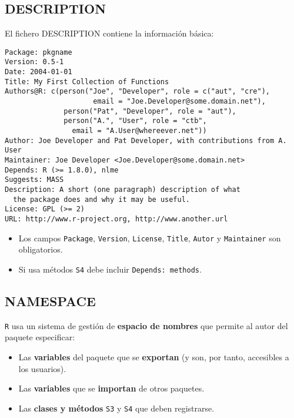 \subsection{DESCRIPTION}
\label{sec:org1a6507c}
\label{subsec:description}
El fichero DESCRIPTION contiene la información básica:
\begin{examplebox}
\begin{verbatim}
Package: pkgname
Version: 0.5-1
Date: 2004-01-01
Title: My First Collection of Functions
Authors@R: c(person("Joe", "Developer", role = c("aut", "cre"),
                     email = "Joe.Developer@some.domain.net"),
              person("Pat", "Developer", role = "aut"),
              person("A.", "User", role = "ctb",
     	        email = "A.User@whereever.net"))
Author: Joe Developer and Pat Developer, with contributions from A. User
Maintainer: Joe Developer <Joe.Developer@some.domain.net>
Depends: R (>= 1.8.0), nlme
Suggests: MASS
Description: A short (one paragraph) description of what
  the package does and why it may be useful.
License: GPL (>= 2)
URL: http://www.r-project.org, http://www.another.url
\end{verbatim}
\end{examplebox}
\begin{itemize}
\item Los campos \texttt{Package}, \texttt{Version}, \texttt{License}, \texttt{Title}, \texttt{Autor} y \texttt{Maintainer} son obligatorios.
\item Si usa métodos \texttt{S4} debe incluir \texttt{Depends: methods}.
\end{itemize}
\subsection{NAMESPACE}
\label{sec:orga6a1aa5}
\label{subsec:namespace}
\texttt{R} usa un sistema de gestión de \textbf{espacio de nombres} que permite al autor del paquete especificar:
\begin{itemize}
\item Las \textbf{variables} del paquete que se \textbf{exportan} (y son, por tanto, accesibles a los usuarios).
\item Las \textbf{variables} que se \textbf{importan} de otros paquetes.
\item Las \textbf{clases y métodos} \texttt{S3} y \texttt{S4} que deben registrarse.
\end{itemize}

